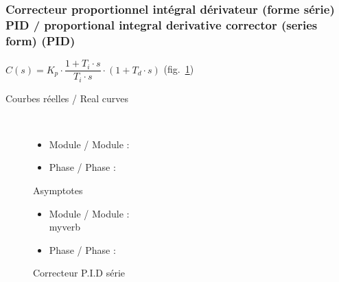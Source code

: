 \documentclass[a4paper,12pt]{article}                      %
\newcommand{\TradEnLigne}[2]{
#1 / {\color{blue}#2}
}
\begin{document}
\subsubsection{\TradEnLigne{Correcteur proportionnel intégral dérivateur (forme série) PID}{proportional integral derivative corrector (series form) (PID)} }

$C(s)=K_p\cdot\dfrac{1+T_i\cdot s}{T_i\cdot s}\cdot\left(1+T_d\cdot s\right)$ (fig.~\ref{fig:corpids})


\begin{description}
\item[\TradEnLigne{Courbes réelles}{Real curves}]~\\
\begin{itemize}
\item \TradEnLigne{Module}{Module}: 
\item \TradEnLigne{Phase}{Phase}: 
\end{itemize}
Asymptotes
\begin{itemize}
\item \TradEnLigne{Module}{Module}: \\myverb{}
\item \TradEnLigne{Phase}{Phase}: 
\end{itemize}
\end{description}

\begin{figure}[!ht]
\centering
\begin{tikzexample}[title=,righthand width=0.55\textwidth,] 
\end{tikzexample}
\caption{Correcteur P.I.D série}
\label{fig:corpids}
\end{figure}

\clearpage
\end{document}
